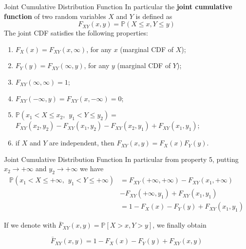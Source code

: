 \documentclass[11pt]{beamer}
\theoremstyle{plain}
\theoremstyle{definition}
\theoremstyle{remark}
\begin{document}
\begin{frame}{Joint Cumulative Distribution Function}
	In particular the \textbf{joint cumulative function} of two random variables $X$ and $Y$ 	is defined as
	\begin{equation}
			F_{XY}(x,y)= \mathbb{P}(X \leq x, Y \leq y)
	\end{equation}
	The joint CDF satisfies the following properties:
    \footnotesize{
    \begin{enumerate}
      	\item   				  						  
		$F_X(x)=F_{XY}(x, \infty)$, for any $x$ (marginal CDF of $X$); 
	  	\item 
	  	$F_Y(y)=F_{XY}(\infty,y)$, for any $y$ (marginal CDF of $Y$);
		\item 
		$F_{XY}(\infty, \infty)=1$;
		\item
		$F_{XY}(-\infty, y)=F_{XY}(x,-\infty)=0$;
		\item
		$\mathbb{P}(x_1 < X \leq x_2, \hspace{5pt} y_1  <Y \leq y_2)=$
        $F_{XY}(x_2,y_2)-F_{XY}(x_1,y_2)-F_{XY}(x_2,y_1)+F_{XY}(x_1,y_1)$;
        \item
        if $X$ and $Y$ are independent, then $F_{XY}(x,y)=F_X(x)F_Y(y)$.
   \end{enumerate}}
\end{frame}
%
\begin{frame}{Joint Cumulative Distribution Function}
		In particular from property 5, putting $x_2 \rightarrow +\infty$ and $y_2 
		\rightarrow +\infty$ we have
			\begin{equation}
			\begin{split}
			\mathbb{P}(x_1 < X \leq +\infty, \hspace{5pt} y_1  <Y \leq +\infty) & =
			     F_{XY}(+\infty,+\infty)-F_{XY}(x_1,+\infty) \\
			     & -F_{XY}(+\infty,y_1)+F_{XY}(x_1,y_1)      \\
			& = 1 - F_X(x) - F_Y(y) + F_{XY}(x_1,y_1)     
			\end{split}
			\end{equation}
        
		If we denote with $\bar F_{XY}(x, y ) = \mathbb{P}[X > x, Y > y]$, we finally obtain
		
		\begin{equation}
		\bar F_{XY}(x, y ) = 1 - F_X(x) - F_Y(y) + F_{XY}(x, y)
		\end{equation}
\end{frame}
\end{document}
